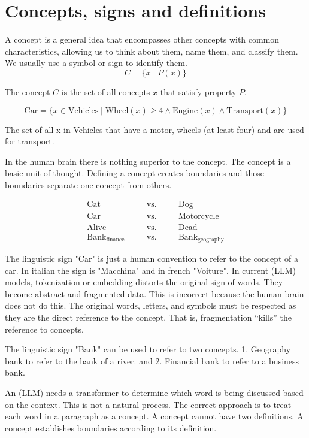 \documentclass[12pt]{article}
\begin{document}
\section{Concepts, signs and definitions}

A concept is a general idea that encompasses other concepts with common characteristics, allowing us to think about them, name them, and classify them. We usually use a symbol or sign to identify them.
\[
C = \{x \mid P(x)\}
\]

The concept $C$ is the set of all concepts $x$ that satisfy property $P$.

\[
\text{Car} = \{ x \in \text{Vehicles} \mid 
\text{Wheel}(x) \ge 4 \land 
\text{Engine}(x) \land 
\text{Transport}(x)
\}
\]

The set of all x in Vehicles that have a motor, wheels (at least four) and are used for transport.

In the human brain there is nothing superior to the concept. The concept is a basic unit of thought. Defining a concept creates boundaries and those boundaries separate one concept from others. 

\[
\begin{array}{rcccl}
	\text{Cat} & \quad & \text{vs.} & \quad & \text{Dog} \\
	\text{Car} & \quad & \text{vs.} & \quad & \text{Motorcycle} \\
	\text{Alive} & \quad & \text{vs.} & \quad & \text{Dead} \\
	\text{Bank}_{\text{finance}} & \quad & \text{vs.} & \quad & \text{Bank}_{\text{geography}}
\end{array}
\]

The linguistic sign "Car" is just a human convention to refer to the concept of a car. In italian the sign is "Macchina" and in french "Voiture".
In current (LLM) models, tokenization or embedding distorts the original sign of words.
They become abstract and fragmented data. This is incorrect because the human brain does not do this.
The original words, letters, and symbols must be respected as they are the direct reference to the concept.
That is, fragmentation “kills” the reference to concepts.

The linguistic sign "Bank" can be used to refer to two concepts. 1. Geography bank to refer to the bank of a river. and 2. Financial bank to refer to a business bank.

An (LLM) needs a transformer to determine which word is being discussed based on the context. This is not a natural process. The correct approach is to treat each word in a paragraph as a concept. A concept cannot have two definitions. A concept establishes boundaries according to its definition.
\end{document}
